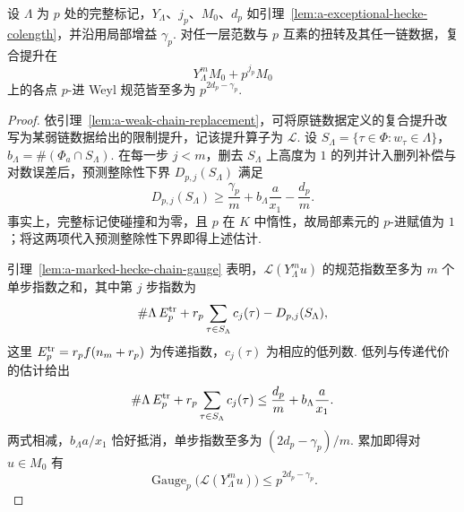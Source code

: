 \begin{lemma}[完整标记子模上的复合提升整除性]
\label{lem:a-full-mark-valuation}
\emitthmsource
设 $\Lambda$ 为 $p$ 处的完整标记，$Y_\Lambda$、$j_p$、$M_0$、$d_p$ 如引理~\ref{lem:a-exceptional-hecke-colength}，并沿用局部增益 $\gamma_p$. 对任一层范数与 $p$ 互素的扭转及其任一链数据，复合提升在
\[
 Y_\Lambda^m M_0+p^{j_p}M_0
\]
上的各点 $p$-进 Weyl 规范皆至多为 $p^{2d_p-\gamma_p}$.
\end{lemma}
\begin{proof}
依引理~\ref{lem:a-weak-chain-replacement}，可将原链数据定义的复合提升改写为某弱链数据给出的限制提升，记该提升算子为 $\mathcal L$. 设 $S_\Lambda=\{\tau\in\Phi:w_\tau\in\Lambda\}$，$b_\Lambda=\#(\Phi_a\cap S_\Lambda)$. 在每一步 $j<m$，删去 $S_\Lambda$ 上高度为 $1$ 的列并计入删列补偿与对数误差后，预测整除性下界 $D_{p,j}(S_\Lambda)$ 满足
\[
 D_{p,j}(S_\Lambda)
 \ge \frac{\gamma_p}{m}+b_\Lambda\frac{a}{x_1}-\frac{d_p}{m}.
\]
事实上，完整标记使碰撞和为零，且 $p$ 在 $K$ 中惰性，故局部素元的 $p$-进赋值为 $1$；将这两项代入预测整除性下界即得上述估计.

引理~\ref{lem:a-marked-hecke-chain-gauge} 表明，$\mathcal L(Y_\Lambda^m u)$ 的规范指数至多为 $m$ 个单步指数之和，其中第 $j$ 步指数为
\[
 \#\Lambda\,E_p^{\rm tr}
 +r_p\sum_{\tau\in S_\Lambda}c_j(\tau)-D_{p,j}(S_\Lambda),
\]
这里 $E_p^{\rm tr}=r_p f(n_m+r_p)$ 为传递指数，$c_j(\tau)$ 为相应的低列数. 低列与传递代价的估计给出
\[
 \#\Lambda\,E_p^{\rm tr}+r_p\sum_{\tau\in S_\Lambda}c_j(\tau)
     \le \frac{d_p}{m}+b_\Lambda\frac a{x_1}.
\]
两式相减，$b_\Lambda a/x_1$ 恰好抵消，单步指数至多为 $(2d_p-\gamma_p)/m$. 累加即得对 $u\in M_0$ 有
\[
 \operatorname{Gauge}_p\bigl(\mathcal L(Y_\Lambda^m u)\bigr)
 \le p^{2d_p-\gamma_p}.
\]


\end{proof}
